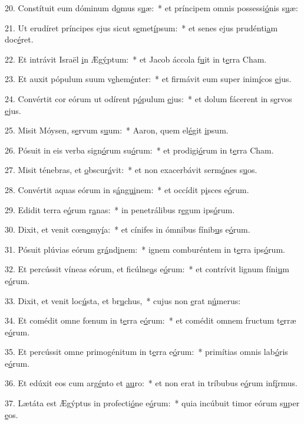 20. Constítuit eum dóminum d\uline{o}mus s\uline{u}æ:~* et príncipem omnis possessi\uline{ó}nis s\uline{u}æ:\par 
21. Ut erudíret príncipes ejus sicut s\uline{e}met\uline{í}psum:~* et senes ejus prudénti\uline{a}m doc\uline{é}ret.\par 
22. Et intrávit Israël \uline{i}n Æg\uline{ý}ptum:~* et Jacob áccola f\uline{u}it in t\uline{e}rra Cham.\par 
23. Et auxit pópulum suum v\uline{e}hem\uline{é}nter:~* et firmávit eum super inim\uline{í}cos \uline{e}jus.\par 
24. Convértit cor eórum ut odírent p\uline{ó}pulum \uline{e}jus:~* et dolum fácerent in s\uline{e}rvos \uline{e}jus.\par 
25. Misit Móysen, s\uline{e}rvum s\uline{u}um:~* Aaron, quem el\uline{é}git \uline{i}psum.\par 
26. Pósuit in eis verba sign\uline{ó}rum su\uline{ó}rum:~* et prodigi\uline{ó}rum in t\uline{e}rra Cham.\par 
27. Misit ténebras, et \uline{o}bscur\uline{á}vit:~* et non exacerbávit serm\uline{ó}nes s\uline{u}os.\par 
28. Convértit aquas eórum in s\uline{á}n\uline{gui}nem:~* et occídit p\uline{i}sces e\uline{ó}rum.\par 
29. Edidit terra e\uline{ó}rum r\uline{a}nas:~* in penetrálibus r\uline{e}gum ips\uline{ó}rum.\par 
30. Dixit, et venit cœn\uline{o}my\uline{í}a:~* et cínifes in ómnibus fínib\uline{u}s e\uline{ó}rum.\par 
31. Pósuit plúvias eórum gr\uline{á}nd\uline{i}nem:~* ignem comburéntem in t\uline{e}rra ips\uline{ó}rum.\par 
32. Et percússit víneas eórum, et ficúlne\uline{a}s e\uline{ó}rum:~* et contrívit lignum fíni\uline{u}m e\uline{ó}rum.\par 
33. Dixit, et venit loc\uline{ú}sta, et br\uline{u}chus,~* cujus non \uline{e}rat n\uline{ú}merus:\par 
34. Et comédit omne fœnum in t\uline{e}rra e\uline{ó}rum:~* et comédit omnem fructum t\uline{e}rræ e\uline{ó}rum.\par 
35. Et percússit omne primogénitum in t\uline{e}rra e\uline{ó}rum:~* primítias omnis lab\uline{ó}ris e\uline{ó}rum.\par 
36. Et edúxit eos cum arg\uline{é}nto et \uline{au}ro:~* et non erat in tríbubus e\uline{ó}rum inf\uline{í}rmus.\par 
37. Lætáta est Ægýptus in profecti\uline{ó}ne e\uline{ó}rum:~* quia incúbuit timor eórum s\uline{u}per \uline{e}os.\par 
